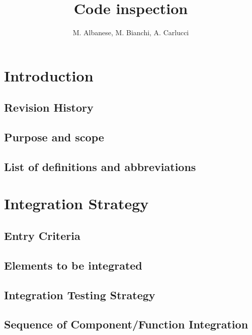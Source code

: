 \documentclass[a4paper, 11pt]{article}
\begin{document}
\title{Code inspection}


\author{M. Albanese, M. Bianchi, A. Carlucci}

\maketitle
\newpage{}
\tableofcontents{}

\newpage{}

\section{Introduction}
\subsection{Revision History} 
\label{sub:revision_history}

\subsection{Purpose and scope} 
\label{sub:purpose_and_scope}

\subsection{List of definitions and abbreviations} 
\label{sub:list_of_definitions_and_abbreviations}

\section{Integration Strategy} 
\label{sec:integration_strategy}

\subsection{Entry Criteria} 
\label{sub:entry_criteria}

\subsection{Elements to be integrated} 
\label{sub:elements_to_be_integrated}

\subsection{Integration Testing Strategy} 
\label{sub:integration_testing_strategy}

\subsection{Sequence of Component/Function Integration} 
\label{sub:sequence_of_component_function_integration}
\end{document}
